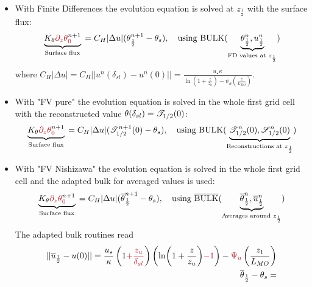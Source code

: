 \begin{itemize}
	\item With Finite Differences the evolution equation is
		solved at $z_{\frac{1}{2}}$ with the surface flux:
		\begin{equation}
			\underbrace{K_\theta
			\emphase{\partial_z \theta}^{n+1}_\emphase{0}}_{\text{
				Surface flux
			}} =
			C_H|\Delta u|(
			\theta_{\frac{1}{2}}^{n+1} - \theta_s),
			~~~ \text{using } {\rm BULK}
			(\underbrace{\theta_{\frac{1}{2}}^{n},
			u_{\frac{1}{2}}^{n}}_{
				\text{FD values at } z_{\frac{1}{2}}
			})
		\end{equation}
		where 
$C_H|\Delta u| = C_H||u^n(\delta_{sl})- u^n(0)|| = 
\frac{u_\star \kappa}{\ln\left(1+\frac{z}{z_{u}}\right)
    - \psi_\theta\left(\frac{z}{L_{MO}}\right) }$.

	\item With "FV pure" the evolution equation is solved in 
		the whole first grid cell with the reconstructed
		value $\theta(\delta_{sl}) = {\cal T}_{1/2}(0)$:
		\begin{equation}
			\underbrace{K_\theta
			\emphase{\partial_z \theta}^{n+1}_\emphase{0}}_{\text{
				Surface flux
			}} =
			C_H|\Delta u|({\cal T}_{1/2}^{n+1}(0)
			- \theta_s),
			~~~ \text{using } {\rm BULK}
			(\underbrace{{\cal T}_{1/2}^{n}(0),
			{\cal S}_{1/2}^{n}(0)}_{
			\text{Reconstructions at } z_{\frac{1}{2}}
			})
		\end{equation}
	\item With "FV Nishizawa" the evolution equation is solved in
		the whole first grid cell and the adapted bulk
		for averaged values is used:
		\begin{equation}
			\underbrace{K_\theta
			\emphase{\partial_z \theta}^{n+1}_\emphase{0}}_{\text{
				Surface flux
			}} =
			C_H|\Delta u| (
			\overline{\theta}_{\frac{1}{2}}^{n+1}
			- \theta_s),
			~~~ \text{using } \overline{\rm BULK}
			(\underbrace{\overline{\theta}_{\frac{1}{2}}^{n},
			\overline{u}_{\frac{1}{2}}^{n}}_{
			\text{Averages around } z_\frac{1}{2}})
		\end{equation}
		The adapted bulk routines read
		\begin{equation}
		\label{eq:ND_StratifiedCase_MOST}
		\begin{aligned}
			 ||\overline{u}_{\frac{1}{2}}-u(0)||
			 = \frac{u_\star}{\kappa}
			\left(1\emphase{+\frac{z_u}{\delta_{sl}}}\right)
		\left(\ln(1+\frac{z}{z_u})\emphase{-1}\right)
		- \emphase{\Psi_u}\left(\frac{z_1}{L_{MO}}\right)
		    \\
			\overline{\theta}_{\frac{1}{2}} - \theta_s=

\end{aligned}
\end{equation}
\end{itemize}
